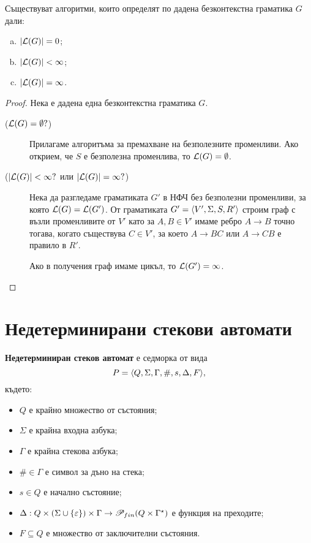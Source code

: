 \begin{thm}
  Съществуват алгоритми, които определят по дадена безконтекстна граматика $G$ дали:
  \begin{enumerate}[a)]
  \item 
    $\lvert{\mathcal{L}(G)}\rvert = 0$;
  \item
    $\lvert{\mathcal{L}(G)}\rvert < \infty$;
  \item
    $\lvert{\mathcal{L}(G)}\rvert = \infty$.
  \end{enumerate}
\end{thm}
\begin{proof}
  Нека е дадена една безконтекстна граматика $G$.
  \begin{description}
  \item[($\mathcal{L}(G) = \emptyset?$)]
    Прилагаме алгоритъма за премахване на безполезните променливи.
    Ако открием, че $S$ е безполезна променлива, то $\mathcal{L}(G) = \emptyset$.
  \item[($\lvert{\mathcal{L}(G)}\rvert < \infty?$ или $\lvert{\mathcal{L}(G)}\rvert = \infty?$)]
    Нека да разгледаме граматиката $G'$ в НФЧ без безполезни променливи, за която $\mathcal{L}(G) = \mathcal{L}(G')$.
    От граматиката $G' = \langle{V',\Sigma,S,R'}\rangle$ строим граф с възли променливите от $V'$ като
    за $A,B \in V'$ имаме ребро $A \to B$ точно тогава, когато съществува $C \in V'$,
    за което $A \to BC$ или $A \to CB$ е правило в $R'$.
    
    Ако в получения граф имаме цикъл, то $\mathcal{L}(G') = \infty$.
  \end{description}
\end{proof}

\section{Недетерминирани стекови автомати}

{\bf Недетерминиран стеков автомат} е седморка от вида
\[P = \langle{Q,\Sigma,\Gamma,\#,s,\Delta,F}\rangle,\] където:
\begin{itemize}
\item
  $Q$ е крайно множество от състояния;
\item  
  $\Sigma$ е крайна входна азбука;
\item
  $\Gamma$ е крайна стекова азбука;
\item
  $\# \in \Gamma$ е символ за дъно на стека;
\item
  $s\in Q$ е начално състояние;
\item
  $\Delta:Q\times(\Sigma \cup \{\varepsilon\})\times\Gamma\rightarrow \mathscr{P}_{fin}(Q\times\Gamma^\star)$ 
  е функция на преходите;    
\item
  $F\subseteq Q$ е множество от заключителни състояния.
\end{itemize}


